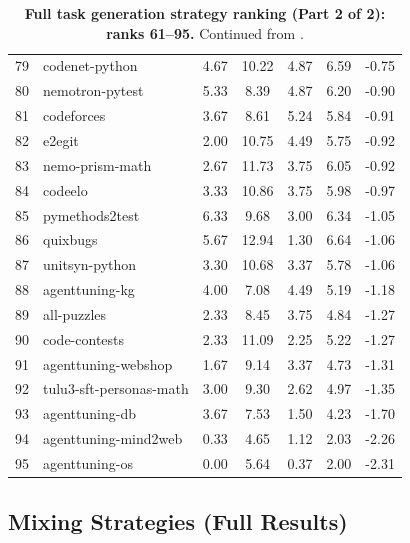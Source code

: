 \documentclass{article}
\begin{document}
\begin{table}[!htbp]
\begin{tabular}{rlccccc}
79 & codenet-python                 &  4.67 & 10.22 &  4.87 &  6.59 & -0.75 \\
80 & nemotron-pytest                &  5.33 &  8.39 &  4.87 &  6.20 & -0.90 \\
81 & codeforces                     &  3.67 &  8.61 &  5.24 &  5.84 & -0.91 \\
82 & e2egit                         &  2.00 & 10.75 &  4.49 &  5.75 & -0.92 \\
83 & nemo-prism-math                &  2.67 & 11.73 &  3.75 &  6.05 & -0.92 \\
84 & codeelo                        &  3.33 & 10.86 &  3.75 &  5.98 & -0.97 \\
85 & pymethods2test                 &  6.33 &  9.68 &  3.00 &  6.34 & -1.05 \\
86 & quixbugs                       &  5.67 & 12.94 &  1.30 &  6.64 & -1.06 \\
87 & unitsyn-python                 &  3.30 & 10.68 &  3.37 &  5.78 & -1.06 \\
88 & agenttuning-kg                 &  4.00 &  7.08 &  4.49 &  5.19 & -1.18 \\
89 & all-puzzles                    &  2.33 &  8.45 &  3.75 &  4.84 & -1.27 \\
90 & code-contests                  &  2.33 & 11.09 &  2.25 &  5.22 & -1.27 \\
91 & agenttuning-webshop            &  1.67 &  9.14 &  3.37 &  4.73 & -1.31 \\
92 & tulu3-sft-personas-math        &  3.00 &  9.30 &  2.62 &  4.97 & -1.35 \\
93 & agenttuning-db                 &  3.67 &  7.53 &  1.50 &  4.23 & -1.70 \\
94 & agenttuning-mind2web           &  0.33 &  4.65 &  1.12 &  2.03 & -2.26 \\
95 & agenttuning-os                 &  0.00 &  5.64 &  0.37 &  2.00 & -2.31 \\
\bottomrule
\end{tabular}
\vspace{10pt}
\caption{\textbf{Full task generation strategy ranking (Part 2 of 2): ranks 61--95.} Continued from .}
\label{tab:task_gen_full_part2}
\end{table}
\FloatBarrier

\subsection{Mixing Strategies (Full Results)}
\label{app:mixing-full}
\end{document}
